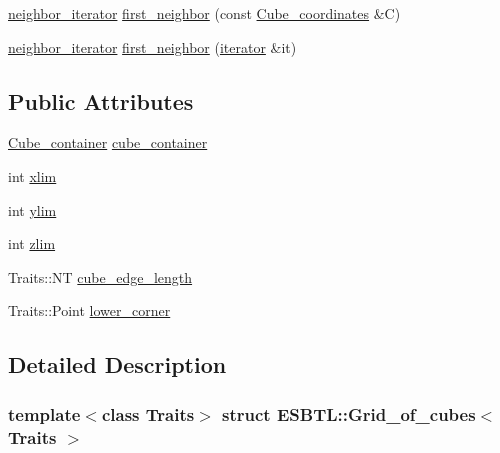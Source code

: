 \begin{DoxyCompactItemize}
\item 
\hyperlink{classESBTL_1_1Grid__of__cubes_1_1neighbor__iterator}{neighbor\+\_\+iterator} \hyperlink{structESBTL_1_1Grid__of__cubes_a375871e53ca8ffc12618b5ab4a949f86}{first\+\_\+neighbor} (const \hyperlink{structESBTL_1_1Grid__of__cubes_ad55c84346bab961e08d95e494551d07d}{Cube\+\_\+coordinates} \&C)
\item 
\hyperlink{classESBTL_1_1Grid__of__cubes_1_1neighbor__iterator}{neighbor\+\_\+iterator} \hyperlink{structESBTL_1_1Grid__of__cubes_a4ea3f48bef443c08ef8551cc2ebf2016}{first\+\_\+neighbor} (\hyperlink{classESBTL_1_1Grid__of__cubes_1_1iterator}{iterator} \&it)
\end{DoxyCompactItemize}
\subsection*{Public Attributes}
\begin{DoxyCompactItemize}
\item 
\hyperlink{structESBTL_1_1Grid__of__cubes_aaa528fd99e0133f58e9f5bb09925a036}{Cube\+\_\+container} \hyperlink{structESBTL_1_1Grid__of__cubes_a343988f314552ec081a79cfab7c24e99}{cube\+\_\+container}
\item 
int \hyperlink{structESBTL_1_1Grid__of__cubes_a59c02aacb00c6c50eccdcc9a11b87392}{xlim}
\item 
int \hyperlink{structESBTL_1_1Grid__of__cubes_aa44d9c45b1a6337ded4108e14373aaf8}{ylim}
\item 
int \hyperlink{structESBTL_1_1Grid__of__cubes_afd4aa09e23df27cc617a6939f8a1fcd6}{zlim}
\item 
Traits\+::\+NT \hyperlink{structESBTL_1_1Grid__of__cubes_adad004eba8b0e99f103411e417854f6e}{cube\+\_\+edge\+\_\+length}
\item 
Traits\+::\+Point \hyperlink{structESBTL_1_1Grid__of__cubes_a23dd03b291ef48d901b683c3b1aaa0a3}{lower\+\_\+corner}
\end{DoxyCompactItemize}


\subsection{Detailed Description}
\subsubsection*{template$<$class Traits$>$\newline
struct E\+S\+B\+T\+L\+::\+Grid\+\_\+of\+\_\+cubes$<$ Traits $>$}

